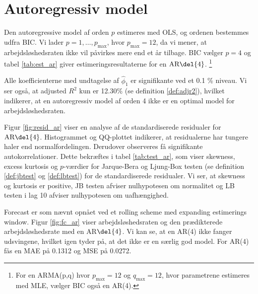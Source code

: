 \section{Autoregressiv model}
Den autoregressive model af orden \(p\) estimeres med OLS, og ordenen bestemmes udfra BIC.
Vi lader $p = 1, \ldots, p_{\max}$, hvor \(p_\text{max}=12\), da vi mener, at arbejdsløshedsraten ikke vil påvirkes mere end et år tilbage.
BIC vælger \(p=4\) og tabel \ref{tab:est_ar} giver estimeringsresultaterne for en \(\text{AR} \del{4}\). \footnote{For en ARMA(p,q) hvor $p_{\max} = 12$ og $q_{\max} = 12$, hvor parametrene estimeres med MLE, vælger BIC også en AR(4).}
%


Alle koefficienterne med undtagelse af $\widehat\phi_1$ er signifikante ved et 0.1 \% niveau. 
Vi ser også, at adjusted $R^2$ kun er 12.30\% (se definition \ref{def:adjr2}), hvilket indikerer, at en autoregressiv model af orden 4 ikke er en optimal model for arbejdsløshedsraten. 



Figur \ref{fig:resid_ar} viser en analyse af de standardiserede residualer for \(\text{AR} \del{4}\). 
Histogrammet og QQ-plottet indikerer, at residualerne har tungere haler end normalfordelingen. 
Derudover observeres få signifikante autokorrelationer.
Dette bekræftes i tabel \ref{tab:test_ar}, som viser skewness, excess kurtosis og \(p\)-værdier for Jarque-Bera og Ljung-Box testen (se definition \ref{def:jbtest} og \ref{def:lbtest}) for de standardiserede residualer. 
Vi ser, at skewness og kurtosis er positive, JB testen afviser nulhypotesen om normalitet og LB testen i lag 10 afviser nulhypotesen om uafhængighed.


Forecast er som nævnt opnået ved et rolling scheme med expanding estimerings window. 
Figur \ref{fig:fc_ar} viser arbejdsløshedsraten og den prædikterede arbejdsløshedsrate med en AR\(\del{4}\).
Vi kan se, at en AR(4) ikke fanger udsvingene, hvilket igen tyder på, at det ikke er en særlig god model. 
For AR(4) fås en MAE på 0.1312 og MSE på 0.0272.
%

\newpage
